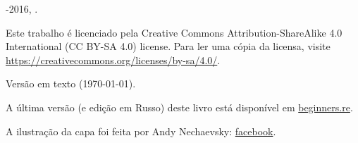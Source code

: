 ﻿	\begin{titlepage}


\end{titlepage}

\newpage

\begin{center}
\vspace*{\fill}
{\LARGE \TITLE}

\vspace*{\fill}

{\large \AUTHOR}

{\large \TT{<\EMAIL>}}
\vspace*{\fill}
\vfill

\ccbysa

-2016, \AUTHOR. 


Este trabalho é licenciado pela Creative Commons Attribution-ShareAlike 4.0 International (CC BY-SA 4.0) license.
Para ler uma cópia da licensa, visite \url{https://creativecommons.org/licenses/by-sa/4.0/}.

Versão em texto ({\large \today}).

A última versão (e edição em Russo) deste livro está disponível em \href{http://go.yurichev.com/17009}{beginners.re}.

A ilustração da capa foi feita por Andy Nechaevsky: \href{http://go.yurichev.com/17023}{facebook}.

\end{center}
